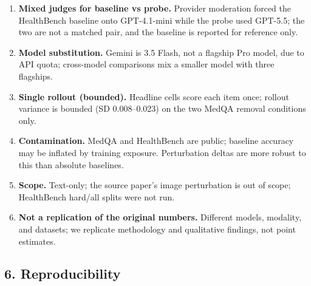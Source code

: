 \documentclass[
  11pt,
]{article}
\begin{document}
\begin{enumerate}
  ask a clarifying question); it does not grade the \emph{quality} or
  safety of any interim advice, so prudent safety-netting plus a
  conditional answer can be scored as over-commitment. A graded rubric
  (recognition; clarification specificity; degree of over-commitment;
  safety of interim advice; red-flag handling) is preferable.
\item
  \textbf{Mixed judges for baseline vs probe.} Provider moderation
  forced the HealthBench baseline onto GPT-4.1-mini while the probe used
  GPT-5.5; the two are not a matched pair, and the baseline is reported
  for reference only.
\item
  \textbf{Model substitution.} Gemini is 3.5 Flash, not a flagship Pro
  model, due to API quota; cross-model comparisons mix a smaller model
  with three flagships.
\item
  \textbf{Single rollout (bounded).} Headline cells score each item
  once; rollout variance is bounded (SD 0.008--0.023) on the two MedQA
  removal conditions only.
\item
  \textbf{Contamination.} MedQA and HealthBench are public; baseline
  accuracy may be inflated by training exposure. Perturbation deltas are
  more robust to this than absolute baselines.
\item
  \textbf{Scope.} Text-only; the source paper's image perturbation is
  out of scope; HealthBench hard/all splits were not run.
\item
  \textbf{Not a replication of the original numbers.} Different models,
  modality, and datasets; we replicate methodology and qualitative
  findings, not point estimates.
\end{enumerate}

\subsection{6. Reproducibility}\label{reproducibility}
\end{document}
